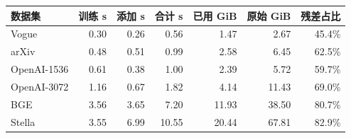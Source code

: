 \begin{tabular}{@{}lrrrrrr@{}}
\toprule
数据集 & 训练 s & 添加 s & 合计 s & 已用 GiB & 原始 GiB & 残差占比 \\
\midrule
Vogue & 0.30 & 0.26 & 0.56 & 1.47 & 2.67 & 45.4\% \\
arXiv & 0.48 & 0.51 & 0.99 & 2.58 & 6.45 & 62.5\% \\
OpenAI-1536 & 0.61 & 0.38 & 1.00 & 2.39 & 5.72 & 59.7\% \\
OpenAI-3072 & 1.16 & 0.67 & 1.82 & 4.14 & 11.43 & 69.0\% \\
BGE & 3.56 & 3.65 & 7.20 & 11.93 & 38.50 & 80.7\% \\
Stella & 3.55 & 6.99 & 10.55 & 20.44 & 67.81 & 82.9\% \\
\bottomrule
\end{tabular}
